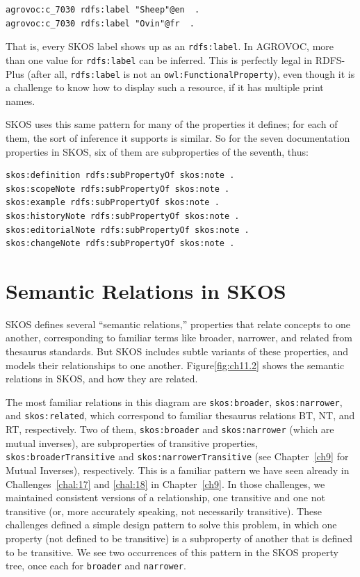 \begin{lstlisting}
agrovoc:c_7030 rdfs:label "Sheep"@en  .
agrovoc:c_7030 rdfs:label "Ovin"@fr  .
\end{lstlisting}

That is, every SKOS label shows up as an \texttt{rdfs:label}. In AGROVOC, more
than one value for \texttt{rdfs:label} can be inferred. This is perfectly legal
in RDFS-Plus (after all, \texttt{rdfs:label} is not an \texttt{owl:FunctionalProperty}),
even though it is a challenge to know how to display such a resource, if
it has multiple print names.

SKOS uses this same pattern for many of the properties it defines; for
each of them, the sort of inference it supports is similar. So for the
seven documentation properties in SKOS, six of them are subproperties of
the seventh, thus:

\begin{lstlisting}
skos:definition rdfs:subPropertyOf skos:note .
skos:scopeNote rdfs:subPropertyOf skos:note .
skos:example rdfs:subPropertyOf skos:note .
skos:historyNote rdfs:subPropertyOf skos:note .
skos:editorialNote rdfs:subPropertyOf skos:note .
skos:changeNote rdfs:subPropertyOf skos:note .
\end{lstlisting}

\section{Semantic Relations in SKOS}

SKOS defines several ``semantic relations,'' properties that relate
concepts to one another, corresponding to familiar terms like broader,
narrower, and related from thesaurus standards. But SKOS includes subtle
variants of these properties, and models their relationships to one
another. Figure\ref{fig:ch11.2} shows the semantic relations in SKOS, and how they
are related.

The most familiar relations in this diagram are \texttt{skos:broader},
\texttt{skos:narrower}, and
\texttt{skos:related}, which correspond to familiar thesaurus relations BT, NT,
and RT, respectively. Two of them, \texttt{skos:broader} and \texttt{skos:narrower} (which
are mutual inverses), are subproperties of transitive properties,
\texttt{skos:broaderTransitive} and \texttt{skos:narrowerTransitive} (see Chapter~\ref{ch9} for
Mutual Inverses), respectively. This is a familiar pattern we have seen
already in Challenges~\ref{chal:17} and \ref{chal:18} in Chapter~\ref{ch9}. In those challenges, we
maintained consistent versions of a relationship, one transitive and one
not transitive (or, more accurately speaking, not necessarily
transitive). These challenges defined a simple design pattern to solve
this problem, in which one property (not defined to be transitive) is a
subproperty of another that is defined to be transitive. We see two
occurrences of this pattern in the SKOS property tree, once each for
\texttt{broader} and \texttt{narrower}.

